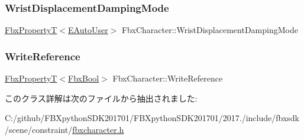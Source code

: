 \subsubsection{\texorpdfstring{Wrist\+Displacement\+Damping\+Mode}{WristDisplacementDampingMode}}
{\footnotesize\ttfamily \hyperlink{class_fbx_property_t}{Fbx\+PropertyT}$<$\hyperlink{class_fbx_character_a5b03462709a82a15d89ee4563a4c49df}{E\+Auto\+User}$>$ Fbx\+Character\+::\+Wrist\+Displacement\+Damping\+Mode}

\mbox{\label{class_fbx_character_a2c1620d6f4dc641672afb3243ae008c3}} 
\subsubsection{\texorpdfstring{Write\+Reference}{WriteReference}}
{\footnotesize\ttfamily \hyperlink{class_fbx_property_t}{Fbx\+PropertyT}$<$\hyperlink{fbxtypes_8h_a92e0562b2fe33e76a242f498b362262e}{Fbx\+Bool}$>$ Fbx\+Character\+::\+Write\+Reference}



このクラス詳解は次のファイルから抽出されました\+:\begin{DoxyCompactItemize}
\item 
C\+:/github/\+F\+B\+Xpython\+S\+D\+K201701/\+F\+B\+Xpython\+S\+D\+K201701/2017./include/fbxsdk/scene/constraint/\hyperlink{fbxcharacter_8h}{fbxcharacter.\+h}\end{DoxyCompactItemize}
